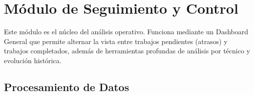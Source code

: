 \documentclass[11pt, letterpaper]{article}
\begin{document}
\section{Módulo de Seguimiento y Control}

Este módulo es el núcleo del análisis operativo. Funciona mediante un Dashboard General que permite alternar la vista entre trabajos pendientes (atrasos) y trabajos completados, además de herramientas profundas de análisis por técnico y evolución histórica.

\subsection{Procesamiento de Datos}
\end{document}
